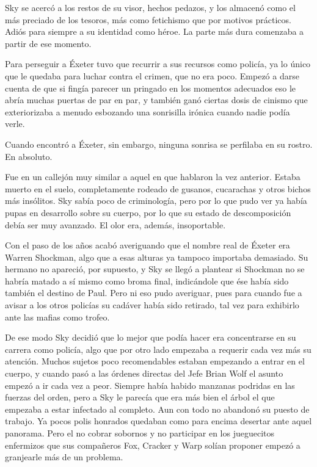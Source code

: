 Sky se acercó a los restos de su visor, hechos pedazos, y los almacenó como el más preciado de los tesoros, más como fetichismo que por motivos prácticos. Adiós para siempre a su identidad como héroe. La parte más dura comenzaba a partir de ese momento.

Para perseguir a Éxeter tuvo que recurrir a sus recursos como policía, ya lo único que le quedaba para luchar contra el crimen, que no era poco. Empezó a darse cuenta de que si fingía parecer un pringado en los momentos adecuados eso le abría muchas puertas de par en par, y también ganó ciertas dosis de cinismo que exteriorizaba a menudo esbozando una sonrisilla irónica cuando nadie podía verle.

Cuando encontró a Éxeter, sin embargo, ninguna sonrisa se perfilaba en su rostro. En absoluto.

Fue en un callejón muy similar a aquel en que hablaron la vez anterior. Estaba muerto en el suelo, completamente rodeado de gusanos, cucarachas y otros bichos más insólitos. Sky sabía poco de criminología, pero por lo que pudo ver ya había pupas en desarrollo sobre su cuerpo, por lo que su estado de descomposición debía ser muy avanzado. El olor era, además, insoportable.

Con el paso de los años acabó averiguando que el nombre real de Éxeter era Warren Shockman, algo que a esas alturas ya tampoco importaba demasiado. Su hermano no apareció, por supuesto, y Sky se llegó a plantear si Shockman no se habría matado a sí mismo como broma final, indicándole que ése había sido también el destino de Paul. Pero ni eso pudo averiguar, pues para cuando fue a avisar a los otros policías su cadáver había sido retirado, tal vez para exhibirlo ante las mafias como trofeo.

De ese modo Sky decidió que lo mejor que podía hacer era concentrarse en su carrera como policía, algo que por otro lado empezaba a requerir cada vez más su atención. Muchos sujetos poco recomendables estaban empezando a entrar en el cuerpo, y cuando pasó a las órdenes directas del Jefe Brian Wolf el asunto empezó a ir cada vez a peor. Siempre había habido manzanas podridas en las fuerzas del orden, pero a Sky le parecía que era más bien el árbol el que empezaba a estar infectado al completo. Aun con todo no abandonó su puesto de trabajo. Ya pocos polis honrados quedaban como para encima desertar ante aquel panorama. Pero el no cobrar sobornos y no participar en los jueguecitos enfermizos que sus compañeros Fox, Cracker y Warp solían proponer empezó a granjearle más de un problema.

